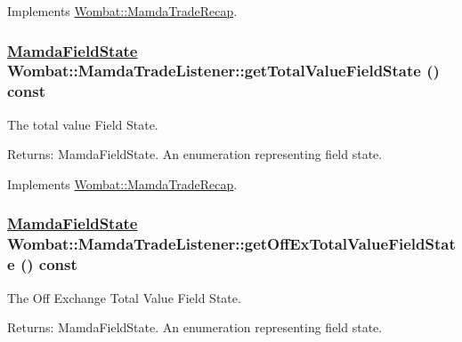 Implements \hyperlink{classWombat_1_1MamdaTradeRecap_28e307415c29dc4a04b1790fabd3ad4f}{Wombat::Mamda\-Trade\-Recap}.\hypertarget{classWombat_1_1MamdaTradeListener_245a68b75564593c36b163aa87f5740b}{
\subsubsection[getTotalValueFieldState]{\setlength{\rightskip}{0pt plus 5cm}\hyperlink{namespaceWombat_93aac974f2ab713554fd12a1fa3b7d2a}{Mamda\-Field\-State} Wombat::Mamda\-Trade\-Listener::get\-Total\-Value\-Field\-State () const}}
\label{classWombat_1_1MamdaTradeListener_245a68b75564593c36b163aa87f5740b}


The total value Field State. 

\begin{Desc}
\item[Returns:]Mamda\-Field\-State. An enumeration representing field state. \end{Desc}


Implements \hyperlink{classWombat_1_1MamdaTradeRecap_26e3f460f499d5bfe7e2d47a77a881ce}{Wombat::Mamda\-Trade\-Recap}.\hypertarget{classWombat_1_1MamdaTradeListener_a47baf1358d91fa1b44bcf2f326f74ca}{
\subsubsection[getOffExTotalValueFieldState]{\setlength{\rightskip}{0pt plus 5cm}\hyperlink{namespaceWombat_93aac974f2ab713554fd12a1fa3b7d2a}{Mamda\-Field\-State} Wombat::Mamda\-Trade\-Listener::get\-Off\-Ex\-Total\-Value\-Field\-State () const}}
\label{classWombat_1_1MamdaTradeListener_a47baf1358d91fa1b44bcf2f326f74ca}


The Off Exchange Total Value Field State. 

\begin{Desc}
\item[Returns:]Mamda\-Field\-State. An enumeration representing field state. \end{Desc}


